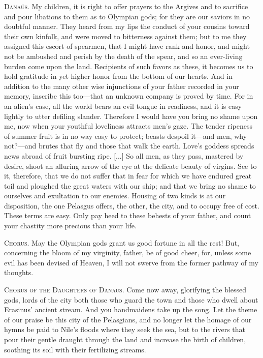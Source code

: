 \documentclass[12pt]{article}
\begin{document}
\textsc{Dana\"{u}s.} My children, it is right to offer prayers to the Argives and to sacrifice and pour libations to them as to Olympian gods; for they are our saviors in no doubtful manner. They heard from my lips the conduct of your cousins toward their own kinfolk, and were moved to bitterness against them; but to me they assigned this escort of spearmen, that I might have rank and honor, and might not be ambushed and perish by the death of the spear, and so an ever-living burden come upon the land. Recipients of such favors as these, it becomes us to hold gratitude in yet higher honor from the bottom of our hearts. And in addition to the many other wise injunctions of your father recorded in your memory, inscribe this too---that an unknown company is proved by time. For in an alien's case, all the world bears an evil tongue in readiness, and it is easy lightly to utter defiling slander. Therefore I would have you bring no shame upon me, now when your youthful loveliness attracts men's gaze. The tender ripeness of summer fruit is in no way easy to protect; beasts despoil it---and men, why not?---and brutes that fly and those that walk the earth. Love's goddess spreads news abroad of fruit bursting ripe. [...] So all men, as they pass, mastered by desire, shoot an alluring arrow of the eye at the delicate beauty of virgins. See to it, therefore, that we do not suffer that in fear for which we have endured great toil and ploughed the great waters with our ship; and that we bring no shame to ourselves and exultation to our enemies. Housing of two kinds is at our disposition, the one Pelasgus offers, the other, the city, and to occupy free of cost. These terms are easy. Only pay heed to these behests of your father, and count your chastity more precious than your life.

\textsc{Chorus.} May the Olympian gods grant us good fortune in all the rest! But, concerning the bloom of my virginity, father, be of good cheer, for, unless some evil has been devised of Heaven, I will not swerve from the former pathway of my thoughts.

\textsc{Chorus of the Daughters of Dana\"{u}s.} Come now away, glorifying the blessed gods, lords of the city both those who guard the town and those who dwell about Erasinus' ancient stream. And you handmaidens take up the song. Let the theme of our praise be this city of the Pelasgians, and no longer let the homage of our hymns be paid to Nile's floods where they seek the sea, but to the rivers that pour their gentle draught through the land and increase the birth of children, soothing its soil with their fertilizing streams.
\end{document}
